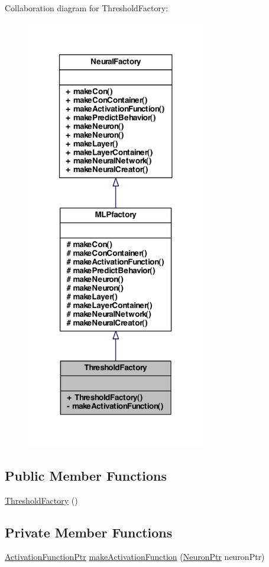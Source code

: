 Collaboration diagram for ThresholdFactory:\nopagebreak
\begin{figure}[H]
\begin{center}
\leavevmode
\includegraphics[width=222pt]{class_threshold_factory__coll__graph}
\end{center}
\end{figure}
\subsection*{Public Member Functions}
\begin{DoxyCompactItemize}
\item 
\hyperlink{class_threshold_factory_a7bf7c828eb1d238a22993fed8e617f72}{ThresholdFactory} ()
\end{DoxyCompactItemize}
\subsection*{Private Member Functions}
\begin{DoxyCompactItemize}
\item 
\hyperlink{_a_m_o_r_e_8h_a77602a0277a02e5769c3df0adc669b17}{ActivationFunctionPtr} \hyperlink{class_threshold_factory_a6be00aaf355c02f73e1f818d3de8c548}{makeActivationFunction} (\hyperlink{_a_m_o_r_e_8h_ac1ea936c2c7728eb382278131652fef4}{NeuronPtr} neuronPtr)
\end{DoxyCompactItemize}


